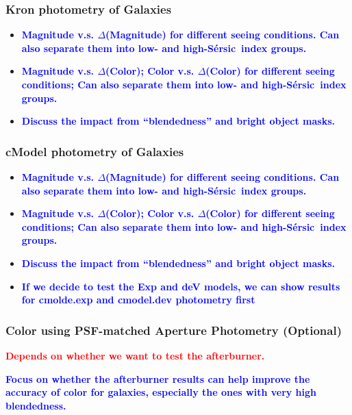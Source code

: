 \documentclass{pasj01}
\def\ser{{S\'{e}rsic\ }}
\newcommand{\plan}[1]{\textcolor{blue} {\textbf{#1}}}
\newcommand{\todo}[1]{\textcolor{red} {\textbf{#1}}}
\begin{document}
\subsubsection{Kron photometry of Galaxies}

    \begin{itemize}
        \item \plan{Magnitude v.s. $\Delta$(Magnitude) for different seeing conditions.
                    Can also separate them into low- and high-\ser index groups.}
        \item \plan{Magnitude v.s. $\Delta$(Color); Color v.s. $\Delta$(Color) for 
                    different seeing conditions; 
                    Can also separate them into low- and high-\ser index groups.}
        \item \plan{Discuss the impact from ``blendedness'' and bright object masks.}
    \end{itemize} 

\subsubsection{cModel photometry of Galaxies}

    \begin{itemize}
        \item \plan{Magnitude v.s. $\Delta$(Magnitude) for different seeing conditions.
                    Can also separate them into low- and high-\ser index groups.}
        \item \plan{Magnitude v.s. $\Delta$(Color); Color v.s. $\Delta$(Color) for 
                    different seeing conditions; 
                    Can also separate them into low- and high-\ser index groups.}
        \item \plan{Discuss the impact from ``blendedness'' and bright object masks.}
        \item \plan{If we decide to test the Exp and deV models, we can show results for 
                    cmolde.exp and cmodel.dev photometry first}
    \end{itemize} 

\subsubsection{Color using PSF-matched Aperture Photometry (Optional)}

    \todo{Depends on whether we want to test the afterburner.}
    
    \plan{Focus on whether the afterburner results can help improve the accuracy of 
          color for galaxies, especially the ones with very high blendedness.}
\end{document}
